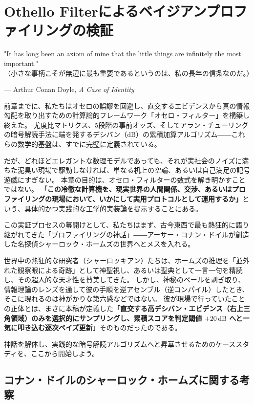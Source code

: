 \chapter{Othello Filter\texttrademark によるベイジアンプロファイリングの検証}
\epigraph{"It has long been an axiom of mine that the little things are infinitely the most important."\\
\small（小さな事柄こそが無辺に最も重要であるというのは、私の長年の信条なのだ。）}{--- Arthur Conan Doyle, \textit{A Case of Identity}}
前章までに、私たちはオセロの誤謬を回避し、直交するエビデンスから真の情報勾配を取り出すための計算論的フレームワーク「オセロ・フィルター」を構築し終えた。
尤度比マトリクス、5段階の事前オッズ、そしてアラン・チューリングの暗号解読手法に端を発するデシバン（$\mathrm{dB}$）の累積加算アルゴリズム――これらの数学的基盤は、すでに完璧に定義されている。

だが、どれほどエレガントな数理モデルであっても、それが実社会のノイズに満ちた泥臭い現場で駆動しなければ、単なる机上の空論、あるいは自己満足の記号遊戯にすぎない。
本章の目的は、オセロ・フィルターの数式を解き明かすことではない。
\textbf{「この冷徹な計算機を、現実世界の人間関係、交渉、あるいはプロファイリングの現場において、いかにして実用プロトコルとして運用するか」}という、具体的かつ実践的な工学的実装論を提示することにある。

この実証プロセスの幕開けとして、私たちはまず、古今東西で最も熱狂的に語り継がれてきた「プロファイリングの神話」――アーサー・コナン・ドイルが創造した名探偵シャーロック・ホームズの世界へとメスを入れる。

世界中の熱狂的な研究者（シャーロッキアン）たちは、ホームズの推理を「並外れた観察眼による奇跡」として神聖視し、あるいは聖典として一言一句を精読し、その超人的な天才性を賛美してきた。
しかし、神秘のベールを剥ぎ取り、情報理論のレンズを通して彼の手順を逆アセンブル（逆コンパイル）したとき、そこに現れるのは神がかりな第六感などではない。
彼が現場で行っていたことの正体とは、まさに本稿が定義した\textbf{「直交する高デシバン・エビデンス（右上三角領域）のみを選択的にサンプリングし、累積スコアを判定閾値 $+20\,\mathrm{dB}$ へと一気に叩き込む逐次ベイズ更新」}そのものだったのである。

神話を解体し、実践的な暗号解読アルゴリズムへと昇華させるためのケーススタディを、ここから開始しよう。


\section{コナン・ドイルのシャーロック・ホームズに関する考察}

